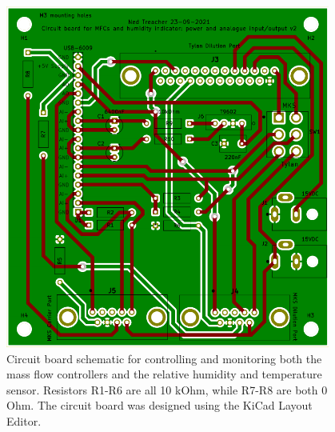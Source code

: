 \documentclass[
  a4paper,
]{scrbook}
\begin{document}
\begin{figure}

{\centering \includegraphics[width=0.95\textwidth,height=\textheight]{figures/ch5/current_PCB.png}

}

\caption{\label{fig-current-pcb-design}Circuit board schematic for
controlling and monitoring both the mass flow controllers and the
relative humidity and temperature sensor. Resistors R1-R6 are all 10
kOhm, while R7-R8 are both 0 Ohm. The circuit board was designed using
the KiCad Layout Editor.}

\end{figure}
\end{document}
